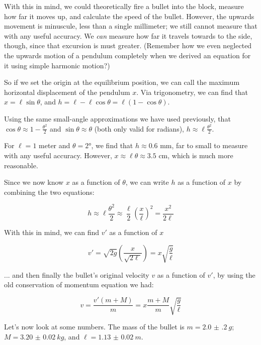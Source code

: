 With this in mind, we could theoretically fire a bullet into the block, measure how far it moves up, and calculate the speed of the bullet. However, the upwards movement is minuscule, less than a single millimeter; we still cannot measure that with any useful accuracy. We \emph{can} measure how far it travels towards to the side, though, since that excursion is must greater. (Remember how we even neglected the upwards motion of a pendulum completely when we derived an equation for it using simple harmonic motion?)

So if we set the origin at the equilibrium position, we can call the maximum horizontal displacement of the pendulum $x$. Via trigonometry, we can find that $x = \ell \sin \theta$, and $h = \ell - \ell \cos \theta = \ell(1 - \cos \theta)$.

Using the same small-angle approximations we have used previously, that $\displaystyle \cos \theta \approx 1 - \frac{\theta^2}{2}$ and $\sin \theta \approx \theta$ (both only valid for radians), $\displaystyle h \approx \ell \frac{\theta^2}{2}$.

For $\ell = 1$ meter and $\theta = \ang{2}$, we find that $h \approx 0.6$ mm, far to small to measure with any useful accuracy. However, $x \approx \ell \theta \approx 3.5$ cm, which is much more reasonable. 

Since we now know $x$ as a function of $\theta$, we can write $h$ as a function of $x$ by combining the two equations:

\begin{equation}
h \approx \ell \frac{\theta^2}{2} \approx \frac{\ell}{2} \left(\frac{x}{\ell}\right)^2 = \frac{x^2}{2 \ell}
\end{equation}

With this in mind, we can find $v'$ as a function of $x$

\begin{equation}
v' = \sqrt{2 g} (\frac{x}{\sqrt{2 \ell}}) = x \sqrt{\frac{g}{\ell}}
\end{equation}

... and then finally the bullet's original velocity $v$ as a function of $v'$, by using the old conservation of momentum equation we had:

\begin{equation}
v = \frac{v'(m + M)}{m} = x \frac{m + M}{m} \sqrt{\frac{g}{\ell}}
\end{equation}

Let's now look at some numbers. The mass of the bullet is $m = \SI{2.0(2)}{g}$; $M = \SI{3.20(2)}{kg}$, and $\ell = \SI{1.13(2)}{m}$.

